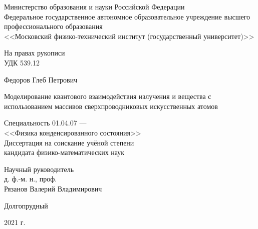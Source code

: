 \documentclass[14pt, a4paper]{extreport}
\numberwithin{equation}{section}
\begin{document}
\begin{titlepage}
\par 
\vspace*{-2cm}
\begin{center}
Министерство образования и науки Российской Федерации\\
Федеральное государственное автономное образовательное учреждение высшего\\ 
профессионального образования \\
<<Московский физико-технический институт (государственный университет)>> 
\end{center}

\vspace*{0.2cm}
\begin{flushright}
На правах рукописи\\
УДК 539.12
\end{flushright}

\vfill

\begin{center}
Федоров Глеб Петрович

\vspace*{0.5cm}

{\large Моделирование квантового взаимодействия излучения и вещества с использованием массивов сверхпроводниковых искусственных атомов}


\begin{center}
Специальность 01.04.07 ---\\ <<Физика конденсированного состояния>>\\
\vspace{0.5cm}
Диссертация на соискание учёной степени \\
кандидата физико-математических наук
\end{center}


\vspace*{2cm}


\begin{flushright}
Научный руководитель\\
д. ф.-м. н., проф.\\
Рязанов Валерий Владимирович
\end{flushright}



\vfill

Долгопрудный

2021 г. 
\end {center} 
\end{titlepage}
\end{document}
